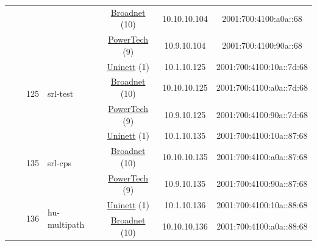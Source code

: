 \begin{small}
\begin{center}
\begin{longtable}{|c|c|c|c|c|c|c|c|}
  &  & \multicolumn{2}{|c|}{} & \multicolumn{2}{|c|}{\tiny{\href{https://www.broadnet.no}{Broadnet} (10)}} & \tiny{10.10.10.104} & \tiny{2001:700:4100:a0a::68} \\* \cline{5-5}\cline{6-6}\cline{7-7}\cline{8-8}
  &  & \multicolumn{2}{|c|}{} & \multicolumn{2}{|c|}{\tiny{\href{http://www.powertech.no}{PowerTech} (9)}} & \tiny{10.9.10.104} & \tiny{2001:700:4100:90a::68} \\* \cline{3-3}\cline{4-4}\cline{5-5}\cline{6-6}\cline{7-7}\cline{8-8}
  &  & \multirow{3}{*}{\tiny{125}} & \multicolumn{1}{|l|}{\multirow{3}{*}{\tiny{srl-test}}} & \multicolumn{2}{|c|}{\tiny{\href{https://www.uninett.no}{Uninett} (1)}} & \tiny{10.1.10.125} & \tiny{2001:700:4100:10a::7d:68} \\* \cline{5-5}\cline{6-6}\cline{7-7}\cline{8-8}
  &  &  &  & \multicolumn{2}{|c|}{\tiny{\href{https://www.broadnet.no}{Broadnet} (10)}} & \tiny{10.10.10.125} & \tiny{2001:700:4100:a0a::7d:68} \\* \cline{5-5}\cline{6-6}\cline{7-7}\cline{8-8}
  &  &  &  & \multicolumn{2}{|c|}{\tiny{\href{http://www.powertech.no}{PowerTech} (9)}} & \tiny{10.9.10.125} & \tiny{2001:700:4100:90a::7d:68} \\* \cline{3-3}\cline{4-4}\cline{5-5}\cline{6-6}\cline{7-7}\cline{8-8}
  &  & \multirow{3}{*}{\tiny{135}} & \multicolumn{1}{|l|}{\multirow{3}{*}{\tiny{srl-cps}}} & \multicolumn{2}{|c|}{\tiny{\href{https://www.uninett.no}{Uninett} (1)}} & \tiny{10.1.10.135} & \tiny{2001:700:4100:10a::87:68} \\* \cline{5-5}\cline{6-6}\cline{7-7}\cline{8-8}
  &  &  &  & \multicolumn{2}{|c|}{\tiny{\href{https://www.broadnet.no}{Broadnet} (10)}} & \tiny{10.10.10.135} & \tiny{2001:700:4100:a0a::87:68} \\* \cline{5-5}\cline{6-6}\cline{7-7}\cline{8-8}
  &  &  &  & \multicolumn{2}{|c|}{\tiny{\href{http://www.powertech.no}{PowerTech} (9)}} & \tiny{10.9.10.135} & \tiny{2001:700:4100:90a::87:68} \\* \cline{3-3}\cline{4-4}\cline{5-5}\cline{6-6}\cline{7-7}\cline{8-8}
  &  & \multirow{3}{*}{\tiny{136}} & \multicolumn{1}{|l|}{\multirow{3}{*}{\tiny{hu-multipath}}} & \multicolumn{2}{|c|}{\tiny{\href{https://www.uninett.no}{Uninett} (1)}} & \tiny{10.1.10.136} & \tiny{2001:700:4100:10a::88:68} \\* \cline{5-5}\cline{6-6}\cline{7-7}\cline{8-8}
  &  &  &  & \multicolumn{2}{|c|}{\tiny{\href{https://www.broadnet.no}{Broadnet} (10)}} & \tiny{10.10.10.136} & \tiny{2001:700:4100:a0a::88:68} \\* \cline{5-5}\cline{6-6}\cline{7-7}\cline{8-8}

\end{longtable}
\end{center}
\end{small}
